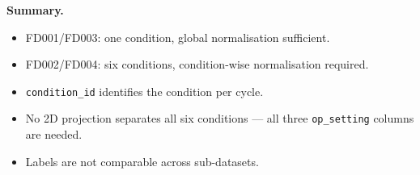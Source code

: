 \documentclass[11pt, a4paper]{article}
\begin{document}
\begin{keybox}
\textbf{Summary.}
\begin{itemize}
  \item FD001/FD003: one condition, global normalisation sufficient.
  \item FD002/FD004: six conditions, condition-wise normalisation required.
  \item \texttt{condition\_id} identifies the condition per cycle.
  \item No 2D projection separates all six conditions ---
        all three \texttt{op\_setting} columns are needed.
  \item Labels are not comparable across sub-datasets.
\end{itemize}
\end{keybox}

\end{document}
